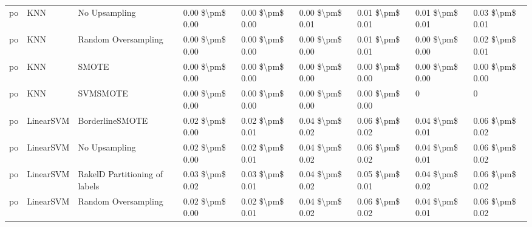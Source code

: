 \begin{tabular}{lllllllll}
      po &                             KNN &                 No Upsampling & 0.00 \$\textbackslash pm\$ 0.00 &           0.00 \$\textbackslash pm\$ 0.00 &       0.00 \$\textbackslash pm\$ 0.01 &        0.01 \$\textbackslash pm\$ 0.01 &                         0.01 \$\textbackslash pm\$ 0.01 &     0.03 \$\textbackslash pm\$ 0.01 \\
      po &                             KNN &           Random Oversampling & 0.00 \$\textbackslash pm\$ 0.00 &           0.00 \$\textbackslash pm\$ 0.00 &       0.00 \$\textbackslash pm\$ 0.00 &        0.01 \$\textbackslash pm\$ 0.01 &                         0.00 \$\textbackslash pm\$ 0.00 &     0.02 \$\textbackslash pm\$ 0.01 \\
      po &                             KNN &                         SMOTE & 0.00 \$\textbackslash pm\$ 0.00 &           0.00 \$\textbackslash pm\$ 0.00 &       0.00 \$\textbackslash pm\$ 0.00 &        0.00 \$\textbackslash pm\$ 0.00 &                         0.00 \$\textbackslash pm\$ 0.00 &     0.00 \$\textbackslash pm\$ 0.00 \\
      po &                             KNN &                      SVMSMOTE & 0.00 \$\textbackslash pm\$ 0.00 &           0.00 \$\textbackslash pm\$ 0.00 &       0.00 \$\textbackslash pm\$ 0.00 &        0.00 \$\textbackslash pm\$ 0.00 &                                       0 &                   0 \\
      po &                       LinearSVM &               BorderlineSMOTE & 0.02 \$\textbackslash pm\$ 0.00 &           0.02 \$\textbackslash pm\$ 0.01 &       0.04 \$\textbackslash pm\$ 0.02 &        0.06 \$\textbackslash pm\$ 0.02 &                         0.04 \$\textbackslash pm\$ 0.01 &     0.06 \$\textbackslash pm\$ 0.02 \\
      po &                       LinearSVM &                 No Upsampling & 0.02 \$\textbackslash pm\$ 0.00 &           0.02 \$\textbackslash pm\$ 0.01 &       0.04 \$\textbackslash pm\$ 0.02 &        0.06 \$\textbackslash pm\$ 0.02 &                         0.04 \$\textbackslash pm\$ 0.01 &     0.06 \$\textbackslash pm\$ 0.02 \\
      po &                       LinearSVM & RakelD Partitioning of labels & 0.03 \$\textbackslash pm\$ 0.02 &           0.03 \$\textbackslash pm\$ 0.01 &       0.04 \$\textbackslash pm\$ 0.02 &        0.05 \$\textbackslash pm\$ 0.01 &                         0.04 \$\textbackslash pm\$ 0.02 &     0.06 \$\textbackslash pm\$ 0.02 \\
      po &                       LinearSVM &           Random Oversampling & 0.02 \$\textbackslash pm\$ 0.00 &           0.02 \$\textbackslash pm\$ 0.01 &       0.04 \$\textbackslash pm\$ 0.02 &        0.06 \$\textbackslash pm\$ 0.02 &                         0.04 \$\textbackslash pm\$ 0.01 &     0.06 \$\textbackslash pm\$ 0.02 \\

\end{tabular}
